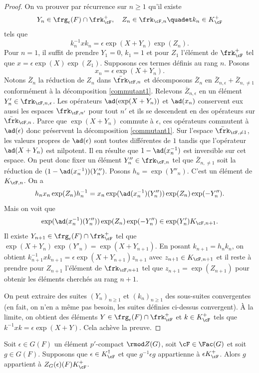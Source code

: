 \begin{proof}
On va prouver par récurrence sur $n\geq1$ qu'il existe
\[
Y_{n}\in \frg_{\epsilon}(F)\cap \frk_{\cF}^+,\quad Z_{n}\in \frk_{\cF,n}\quadet k_{n}\in K_{\cF}^+
\]
tels que
\[
k_{n}^{-1}xk_{n}=\epsilon \exp(X+Y_{n})\exp(Z_{n}).
\]
Pour $n=1$, il suffit de prendre $Y_{1}=0$, $k_{1}=1$ et pour $Z_{1}$ l'élément de $\frk_{\cF}^+$ tel que $x=\epsilon \exp(X)\exp(Z_{1})$. Supposons ces termes définis au rang $n$. Posons
\[
x_{n}=\epsilon \exp(X+Y_{n}).
\]
Notons $\bar{Z}_{n}$ la réduction de $Z_{n}$ dans $\bar{\frk}_{\cF,n}$ et décomposons $\bar{Z}_{n}$ en $\bar{Z}_{n,\epsilon}+\bar{Z}_{n,\neq1}$ conformément à la décomposition \eqref{commutant1}. Relevons $\bar{Z}_{n,\epsilon}$ en un élément $Y'_{n}\in \frk_{\cF,n,\epsilon}$. Les opérateurs $\ad(\exp(X+Y_{n}))$ et $\ad(x_{n})$ conservent eux aussi les espaces $\frk_{\cF,n'}$ pour tout $n'$ et ils se descendent en des opérateurs sur $\bar{\frk}_{\cF,n}$. Parce que $\exp(X+Y_{n})$ commute à $\epsilon$, ces opérateurs commutent à $\ad(\epsilon)$ donc préservent la décomposition \eqref{commutant1}. Sur l'espace $\bar{\frk}_{\cF,\neq1}$, les valeurs propres de $\ad(\epsilon)$ sont toutes différentes de $1$ tandis que l'opérateur $\ad(X+Y_{n})$ est nilpotent. Il en résulte que $1-\ad(x_{n}^{-1})$ est inversible sur cet espace. On peut donc fixer un élément $Y''_{n}\in \frk_{\cF,n}$ tel que $\bar{Z}_{n,\neq1}$ soit la réduction de $(1-\ad(x_{n}^{-1}))(Y''_{n})$. Posons $h_{n}=\exp(Y''_{n})$. C'est un élément de $K_{\cF,n}$. On a
\[
h_{n}x_{n}\exp(Z_{n})h_{n}^{-1}=x_{n}\exp(\ad(x_{n}^{-1})(Y''_{n}))\exp(Z_{n})\exp(-Y''_{n}).
\]
Mais on voit que
\[
\exp(\ad(x_{n}^{-1})(Y''_{n}))\exp(Z_{n})\exp(-Y''_{n})\in \exp(Y'_{n})K_{\cF,n+1}.
\]
Il existe $Y_{n+1}\in \frg_{\epsilon}(F)\cap \frk_{\cF}^+ $ tel que $\exp(X+Y_{n})\exp(Y'_{n})=\exp(X+Y_{n+1})$. En posant $k_{n+1}=h_{n}k_{n}$, on obtient
$k_{n+1}^{-1}xk_{n+1}=\epsilon \exp(X+Y_{n+1})z_{n+1}$ avec $z_{n+1}\in K_{\cF,n+1}$ et il reste à prendre pour $Z_{n+1}$ l'élément de $\frk_{\cF,n+1}$ tel que $z_{n+1}=\exp(Z_{n+1})$ pour obtenir les éléments cherchés au rang $n+1$.

On peut extraire des suites $(Y_{n})_{n\geq1}$ et $(k_{n})_{n\geq1}$ des sous-suites convergentes (en fait, on n'en a même pas besoin, les suites définies ci-dessus convergent). À la limite, on obtient des éléments $Y\in \frg_{\epsilon}(F)\cap \frk_{\cF}^+$ et $k\in K_{\cF}^+$ tels que $k^{-1}xk=\epsilon \exp(X+Y)$. Cela achève la preuve.
\end{proof}

\label{corollaire}
\begin{cor*}
Soit $\epsilon\in G(F)$ un élément $p'$-compact $\rmod Z(G)$, soit $\cF\in \Fac(G)$ et soit $g\in G(F)$. Supposons que $\epsilon\in K_{\cF}^{\dag}$ et que $g^{-1}\epsilon g$ appartienne à $\epsilon K_{\cF}^+$. Alors $g$ appartient à $Z_{G}(\epsilon)(F)K_{\cF}^+$.
\end{cor*}

